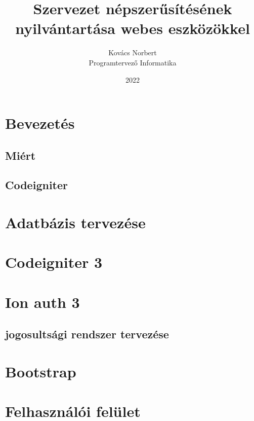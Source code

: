 \documentclass[
]{thesis-ekf}
\begin{document}
\title{Szervezet népszerűsítésének nyilvántartása webes eszközökkel}
\author{Kovács Norbert\\Programtervező Informatika}
\date{2022}
\maketitle

\tableofcontents

\chapter*{Bevezetés}
\section*{Miért}
\section*{Codeigniter}
\cite[27--28]{Bona}

\chapter{Adatbázis tervezése}
\cite[]{Gyorffy,Juhasz}

\chapter{Codeigniter 3}
\cite[]{Gyorffy,Juhasz}

\chapter{Ion auth 3}
\section{jogosultsági rendszer tervezése}
\cite[]{Gyorffy,Juhasz}

\chapter{Bootstrap}
\cite[]{Gyorffy,Juhasz}

\chapter{Felhasználói felület}
\cite[]{Gyorffy,Juhasz}
\end{document}

